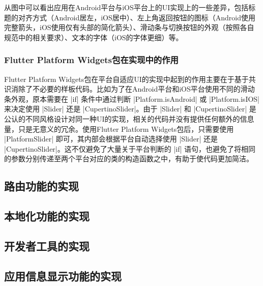 从图中可以看出应用在Android平台与iOS平台上的UI实现上的一些差异，包括标题的对齐方式（Android居左，iOS居中）、左上角返回按钮的图标（Android使用完整箭头，iOS使用仅有头部的简化箭头）、滑动条与切换按钮的外观（按照各自规范中的相关要求）、文本的字体（iOS的字体更细）等。

\subsubsection{Flutter Platform Widgets包在实现中的作用}

Flutter Platform Widgets包在平台自适应UI的实现中起到的作用主要在于基于共识消除了不必要的样板代码。比如为了在Android平台和iOS平台使用不同的滑动条外观，原本需要在 |if| 条件中通过判断 |Platform.isAndroid| 或 |Platform.isIOS| 来决定使用 |Slider| 还是 |CupertinoSlider|。由于 |Slider| 和 |CupertinoSlider| 是公认的不同风格设计对同一种UI的实现，相关的代码并没有提供任何额外的信息量，只是无意义的冗余。使用Flutter Platform Widgets包后，只需要使用 |PlatformSlider| 即可，其内部会根据平台自动选择使用 |Slider| 还是 |CupertinoSlider|。这不仅避免了大量关于平台判断的 |if| 语句，也避免了将相同的参数分别传递至两个平台对应的类的构造函数之中，有助于使代码更加简洁。

\subsection{路由功能的实现}\label{subsec:router}


\subsection{本地化功能的实现}\label{subsec:l10n}


\subsection{开发者工具的实现}\label{subsec:dev-tools}


\subsection{应用信息显示功能的实现}\label{subsec:about}

